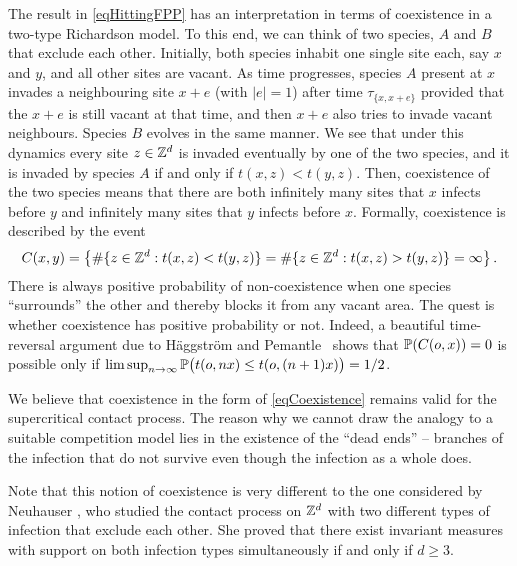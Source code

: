 The result in \eqref{eqHittingFPP} has an interpretation in terms of coexistence in a two-type Richardson model. %
To this end, we can think of two species, $A$ and $B$ that exclude each other. Initially, both species inhabit one single site each, say $x$ and $y$, and all other sites are vacant. As time progresses, species $A$ present at $x$ invades a neighbouring site $x+e$ (with $|e|=1$) after time $\tau_{\{x,x+e\}}$ provided that the $x+e$ is still vacant at that time, and then $x+e$ also tries to invade vacant neighbours. Species $B$ evolves in the same manner. We see that under this dynamics every site $z\in\Zd$ is invaded eventually by one of the two species, and it is invaded by species $A$ if and only if  $t(x,z) < t(y,z)$. 
Then, coexistence of the two species means that there are both infinitely many sites that $x$ infects before $y$ and infinitely many sites that $y$ infects before $x$. Formally, coexistence is described by the event
\begin{equation}\label{eqCoexistence}
	C(x,y)=\left\{\#\{z\in\Zd:t(x,z)<t(y,z)\} = \#\{z\in\Zd:t(x,z) > t(y,z)\} = \infty\right\}. 
\end{equation}
There is always positive probability of non-coexistence when one species ``surrounds'' the other and thereby blocks it from any vacant area. The quest is whether coexistence has positive probability or not. Indeed, a beautiful time-reversal argument due to H\"aggstr\"om and Pemantle~\cite{HaggsPeman98} shows that $\P(C(o,x))=0$ is possible only if $\limsup_{n \to \infty} \P\big(t(o,{nx}) \le t(o,(n+1)x)\big) = 1/2$.

We believe that coexistence in the form of \eqref{eqCoexistence} remains valid for the supercritical contact process. 
The reason why we cannot draw the analogy to a suitable competition model lies in the existence of the ``dead ends'' -- branches of the infection that do not survive even though the infection as a whole does. 

Note that this notion of coexistence is very different to the one considered by Neuhauser \cite{Neuha92}, who studied the  contact process on $\Zd$ with two different types of infection that exclude each other. She proved that there exist invariant measures with support on both infection types simultaneously if and only if $d\ge3$.  
\fi

